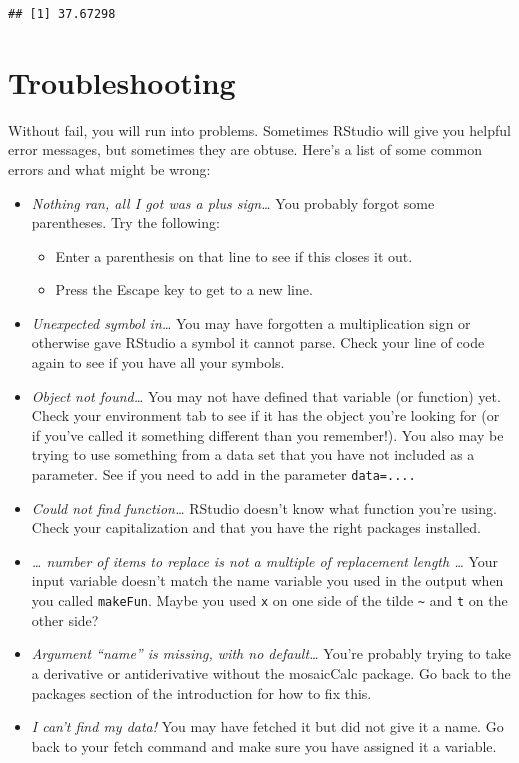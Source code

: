 \documentclass[
]{book}
\providecommand{\tightlist}{%
  \setlength{\itemsep}{0pt}\setlength{\parskip}{0pt}}
\begin{document}
\begin{verbatim}
## [1] 37.67298
\end{verbatim}

\hypertarget{troubleshooting}{%
\section{Troubleshooting}\label{troubleshooting}}

Without fail, you will run into problems. Sometimes RStudio will give you helpful error messages, but sometimes they are obtuse. Here's a list of some common errors and what might be wrong:

\begin{itemize}
\item
  \emph{Nothing ran, all I got was a plus sign\ldots{}} You probably forgot some parentheses. Try the following:

  \begin{itemize}
  \tightlist
  \item
    Enter a parenthesis on that line to see if this closes it out.
  \item
    Press the Escape key to get to a new line.
  \end{itemize}
\item
  \emph{Unexpected symbol in\ldots{}} You may have forgotten a multiplication sign or otherwise gave RStudio a symbol it cannot parse. Check your line of code again to see if you have all your symbols.
\item
  \emph{Object not found\ldots{}} You may not have defined that variable (or function) yet. Check your environment tab to see if it has the object you're looking for (or if you've called it something different than you remember!). You also may be trying to use something from a data set that you have not included as a parameter. See if you need to add in the parameter \texttt{data=....}
\item
  \emph{Could not find function\ldots{}} RStudio doesn't know what function you're using. Check your capitalization and that you have the right packages installed.
\item
  \emph{\ldots{} number of items to replace is not a multiple of replacement length \ldots{}} Your input variable doesn't match the name variable you used in the output when you called \texttt{makeFun}. Maybe you used \texttt{x} on one side of the tilde \texttt{\textasciitilde{}} and \texttt{t} on the other side?
\item
  \emph{Argument ``name'' is missing, with no default\ldots{}}
  You're probably trying to take a derivative or antiderivative without the mosaicCalc package. Go back to the packages section of the introduction for how to fix this.
\item
  \emph{I can't find my data!} You may have fetched it but did not give it a name. Go back to your fetch command and make sure you have assigned it a variable.
\end{itemize}
\end{document}
